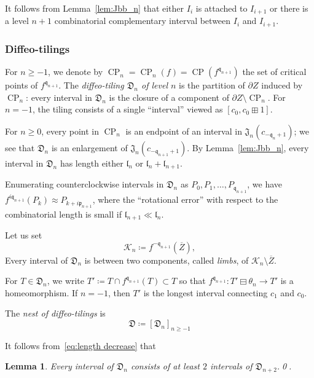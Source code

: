 \documentclass{amsart}
\newcommand{\1}{{\mathbb 1 }}
\newcommand{\pp}{\mathfrak{p}}
\newcommand{\qq}{\mathfrak{q}}
\newcommand{\length}{{\mathfrak l}}
\newcommand{\Jbb}{{\mathfrak{J}}}
\newcommand{\Dbb}{{\mathfrak{D}}}
\newtheorem{lem}[thm]{Lemma}
\theoremstyle{remark}
\numberwithin{equation}{section}
\theoremstyle{definition}
\newcommand{\filled}{{\mathcal {K} }}
\newcommand{\CP}{{\operatorname{CP}}}
\begin{document}
It follows from Lemma~\ref{lem:Jbb_n} that either $I_i$ is attached to $I_{i+1}$ or there is a level $n+1$ combinatorial complementary interval between $I_{i}$ and $I_{i+1}$.

  


\subsubsection{Diffeo-tilings}
\label{sss:diff tilings} For $n\ge -1$, we denote by $\CP_n=\CP_n(f)=\CP(f^{\qq_{n+1}})$ the set of critical points of $f^{\qq_{n+1}}$.
 The \emph{diffeo-tiling $\Dbb_n$ of level $n$} is the partition of $\partial Z$ induced by $\CP_n$: every interval in $\Dbb_n$ is the closure of a component of $\partial Z \setminus \CP_n$. For $n=-1$, the tiling consists of a single ``interval'' viewed as $[c_0,c_0\boxplus 1]$.



 For $n\ge 0$, every point in $\CP_n$ is an endpoint of an interval in $\Jbb_n(c_{-\qq_n+1})$; we see that $\Dbb_n$ is an enlargement of $\Jbb_n(c_{-\qq_{n+1}+1})$. By Lemma~\ref{lem:Jbb_n}, every interval in $\Dbb_n$ has length either $\length_n$ or $\length_n+\length_{n+1}$. 
 
 Enumerating counterclockwise intervals in $\Dbb_n$ as $P_0, P_1,\dots, P_{\qq_{n+1}}$, we have $f^{i\qq_{n+1}}(P_k)\approx P_{k+ i\pp_{n+1} }$, where the ``rotational error'' with respect to the combinatorial length is small if $\length_{n+1}\ll \length_n$.
 
 
 

Let us set 
\begin{equation}
\label{eq:dfn:filled_n}
\filled_n\coloneqq f^{-\qq_{n+1} } (\overline Z),
\end{equation}
Every interval of $\Dbb_n$ is between two components, called \emph{limbs}, of $\filled_n\setminus \overline Z$.
 


For  $T\in \Dbb_n$, we write $T'\coloneqq T\cap f^{\qq_{n+1}}(T)\subset T$ so that $f^{\qq_{n+1}}\colon T'\boxminus \theta_{n} \to T'$ is a homeomorphism. If $n=-1$, then $T'$ is the longest interval connecting $c_1$ and $c_0$.

The \emph{nest of diffeo-tilings} is 
\begin{equation}
\label{eq:diffeo nest}
\Dbb\coloneqq [\Dbb_n]_{n\ge -1}
\end{equation}

It follows from~\eqref{eq:length decrease} that
\begin{lem}
\label{lem:Dbb_n:Dbb_n+2}
Every interval of $\Dbb_n$ consists of at least $2$ intervals of $\Dbb_{n+2}$.\qed.
\end{lem}
\end{document}
